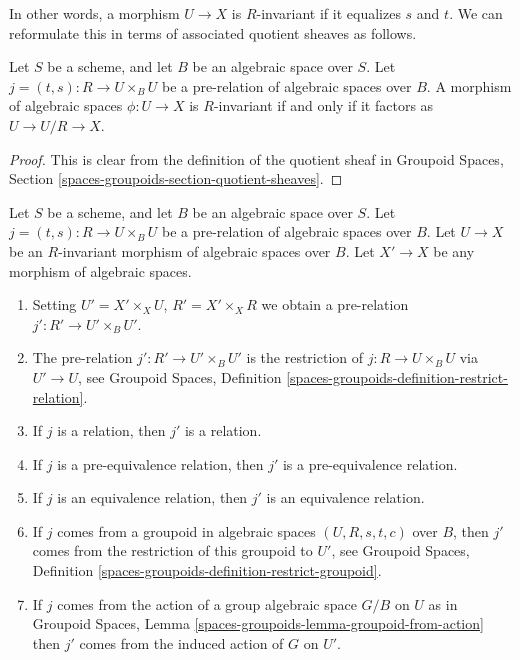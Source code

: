 \noindent
In other words, a morphism $U \to X$ is $R$-invariant if it equalizes
$s$ and $t$.  We can reformulate this in terms of associated quotient
sheaves as follows.

\begin{lemma}
\label{lemma-invariant}
Let $S$ be a scheme, and let $B$ be an algebraic space over $S$.
Let $j = (t, s) : R \to U \times_B U$ be a pre-relation of algebraic
spaces over $B$. A morphism of algebraic spaces $\phi : U \to X$ is
$R$-invariant if and only if it factors as
$U \to U/R \to X$.
\end{lemma}

\begin{proof}
This is clear from the definition of the quotient sheaf in
Groupoid Spaces, Section \ref{spaces-groupoids-section-quotient-sheaves}.
\end{proof}

\begin{lemma}
\label{lemma-pullback-invariant}
Let $S$ be a scheme, and let $B$ be an algebraic space over $S$.
Let $j = (t, s) : R \to U \times_B U$ be a pre-relation of algebraic
spaces over $B$. Let $U \to X$ be an $R$-invariant morphism of algebraic
spaces over $B$. Let $X' \to X$ be any morphism of algebraic spaces.
\begin{enumerate}
\item Setting $U' = X' \times_X U$, $R' = X' \times_X R$ we obtain
a pre-relation $j' : R' \to U' \times_B U'$.
\item The pre-relation $j' : R' \to U' \times_B U'$ is the restriction of
$j : R \to U \times_B U$ via $U' \to U$, see
Groupoid Spaces, Definition \ref{spaces-groupoids-definition-restrict-relation}.
\item If $j$ is a relation, then $j'$ is a relation.
\item If $j$ is a pre-equivalence relation, then
$j'$ is a pre-equivalence relation.
\item If $j$ is an equivalence relation, then $j'$ is an equivalence
relation.
\item If $j$ comes from a groupoid in algebraic spaces
$(U, R, s, t, c)$ over $B$, then $j'$ comes from the restriction
of this groupoid to $U'$, see
Groupoid Spaces, Definition \ref{spaces-groupoids-definition-restrict-groupoid}.
\item If $j$ comes from the action of a group algebraic space $G/B$ on $U$
as in
Groupoid Spaces, Lemma \ref{spaces-groupoids-lemma-groupoid-from-action}
then $j'$ comes from the induced action of $G$ on $U'$.
\end{enumerate}
\end{lemma}

